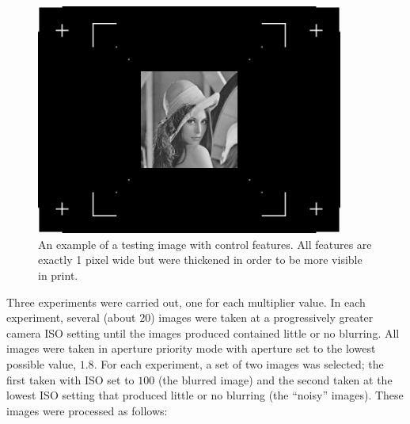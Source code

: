 \documentclass[12pt,notitlepage]{report}
\begin{document}
\begin{figure}[h]
 \centering
  \includegraphics[width=0.9\textwidth]{testing_image_control_points.png}
 \caption[An example of a testing image with control features]{An example of a testing image with control features. All features are exactly 1 pixel wide but were thickened in order to be more visible in print.}
 \label{fig:testing_image_control_points}
\end{figure}

Three experiments were carried out, one for each multiplier value. In each experiment, several (about $20$) images were taken at a progressively greater camera ISO setting until the images produced contained little or no blurring. All images were taken in aperture priority mode with aperture set to the lowest possible value, $1.8$. For each experiment, a set of two images was selected; the first taken with ISO set to $100$ (the blurred image) and the second taken at the lowest ISO setting that produced little or no blurring (the ``noisy'' images). These images were processed as follows: 
\end{document}
